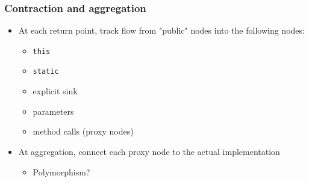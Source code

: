 \documentclass{beamer}
\newcommand{\code}[1]{\colorbox{code}{\texttt{\footnotesize #1}}}
\begin{document}
\begin{frame}
  \frametitle{Contraction and aggregation}
  \begin{itemize}
    \item At each return point, track flow from "public" nodes into the following nodes:
      \begin{itemize}
        \item \code{this}
        \item \code{static}
        \item explicit sink
        \item parameters
        \item method calls (proxy nodes)
      \end{itemize}
    \item At aggregation, connect each proxy node to the actual implementation
      \begin{itemize}
        \item Polymorphism?
      \end{itemize}
  \end{itemize}
\end{frame}
\end{document}
